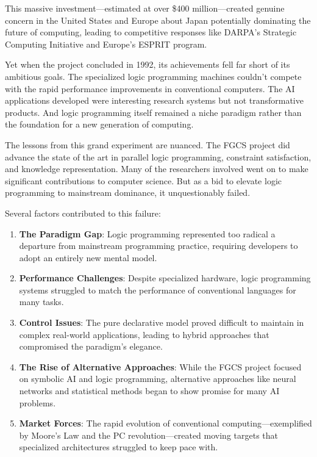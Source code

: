 \documentclass[11pt]{article}
\begin{document}
This massive investment—estimated at over \$400 million—created genuine concern in the United States and Europe about Japan potentially dominating the future of computing, leading to competitive responses like DARPA's Strategic Computing Initiative and Europe's ESPRIT program.

Yet when the project concluded in 1992, its achievements fell far short of its ambitious goals. The specialized logic programming machines couldn't compete with the rapid performance improvements in conventional computers. The AI applications developed were interesting research systems but not transformative products. And logic programming itself remained a niche paradigm rather than the foundation for a new generation of computing.

The lessons from this grand experiment are nuanced. The FGCS project did advance the state of the art in parallel logic programming, constraint satisfaction, and knowledge representation. Many of the researchers involved went on to make significant contributions to computer science. But as a bid to elevate logic programming to mainstream dominance, it unquestionably failed.

Several factors contributed to this failure:

\begin{enumerate}
\item \textbf{The Paradigm Gap}: Logic programming represented too radical a departure from mainstream programming practice, requiring developers to adopt an entirely new mental model.

\item \textbf{Performance Challenges}: Despite specialized hardware, logic programming systems struggled to match the performance of conventional languages for many tasks.

\item \textbf{Control Issues}: The pure declarative model proved difficult to maintain in complex real-world applications, leading to hybrid approaches that compromised the paradigm's elegance.

\item \textbf{The Rise of Alternative Approaches}: While the FGCS project focused on symbolic AI and logic programming, alternative approaches like neural networks and statistical methods began to show promise for many AI problems.

\item \textbf{Market Forces}: The rapid evolution of conventional computing—exemplified by Moore's Law and the PC revolution—created moving targets that specialized architectures struggled to keep pace with.
\end{enumerate}
\end{document}
